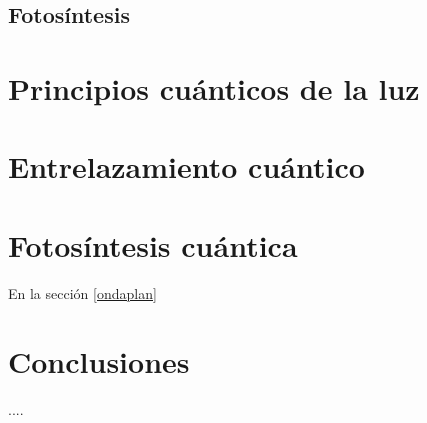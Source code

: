 \documentclass[letterpaper,12pt,oneside]{book}
\begin{document}
\section{Fotos\'intesis }

\chapter{Principios cu\'anticos de la luz}


\chapter{Entrelazamiento cu\'antico}


\chapter{Fotos\'intesis cu\'antica}

En la secci\'on \ref{ondaplan}



\chapter{Conclusiones}
....
\end{document}
